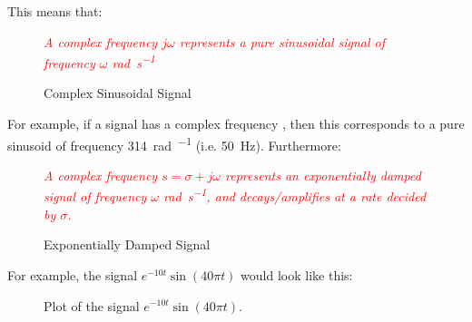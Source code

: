 \documentclass[../notes-main.tex]{subfiles}
\begin{document}
\noindent This means that:
\begin{figure}[H]
    \centering
    \begin{mdframed}
        \begin{center}
            \textcolor{red}{\emph{A complex frequency \(j\omega \) represents a pure sinusoidal signal of frequency \(\omega \) \unit{\radian\per\second}}}
        \end{center}
    \end{mdframed}\label{fig:complex-sinusoid-def-1}
    \vspace{-1em}\caption{Complex Sinusoidal Signal}
\end{figure}
\vspace{-1em}
\noindent For example, if a signal has a complex frequency  , then this corresponds to a pure sinusoid of frequency \SI{314}{\radian\per\sec} (i.e. \SI{50}{\hertz}). Furthermore:
\begin{figure}[H]
    \centering
    \begin{mdframed}
        \begin{center}
            \textcolor{red}{%
                \emph{A complex frequency \(s = \sigma + j\omega \) represents an exponentially
                    damped signal of frequency \(\omega \) \unit{\radian\per\second}, and decays/amplifies at a rate decided by \(\sigma \).}}
        \end{center}
    \end{mdframed}\label{fig:exp-damped-sinusoid-def-1}
    \vspace{-1em}\caption{Exponentially Damped Signal}
\end{figure}
\vspace{-1em}
\noindent For example, the signal \( e^{- 10t}\sin(40\pi t) \) would look like this:
\begin{figure}[H]
    \centering
    \vspace{-1em}\caption{Plot of the signal \(e^{-10t}\sin(40\pi t)\).}\label{fig:exp-damped-sinusoid-plot-1}
\end{figure}
\vspace{-1em}
\end{document}
